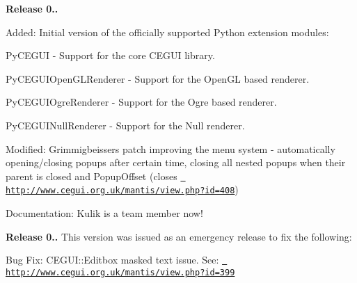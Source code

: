 {\bfseries{Release 0..}}
\begin{DoxyItemize}
\item Added\+: Initial version of the officially supported Python extension modules\+:
\begin{DoxyItemize}
\item Py\+C\+E\+G\+UI -\/ Support for the core C\+E\+G\+UI library.
\item Py\+C\+E\+G\+U\+I\+Open\+G\+L\+Renderer -\/ Support for the Open\+GL based renderer.
\item Py\+C\+E\+G\+U\+I\+Ogre\+Renderer -\/ Support for the Ogre based renderer.
\item Py\+C\+E\+G\+U\+I\+Null\+Renderer -\/ Support for the Null renderer.
\end{DoxyItemize}
\item Modified\+: Grimmigbeisser\textquotesingle{}s patch improving the menu system -\/ automatically opening/closing popups after certain time, closing all nested popups when their parent is closed and Popup\+Offset (closes \href{http://www.cegui.org.uk/mantis/view.php?id=408}{\texttt{ http\+://www.\+cegui.\+org.\+uk/mantis/view.\+php?id=408}})
\item Documentation\+: Kulik is a team member now!
\end{DoxyItemize}

{\bfseries{Release 0..}} This version was issued as an \textquotesingle{}emergency release\textquotesingle{} to fix the following\+:
\begin{DoxyItemize}
\item Bug Fix\+: C\+E\+G\+U\+I\+::\+Editbox masked text issue. See\+: \href{http://www.cegui.org.uk/mantis/view.php?id=399}{\texttt{ http\+://www.\+cegui.\+org.\+uk/mantis/view.\+php?id=399}}
\end{DoxyItemize}

